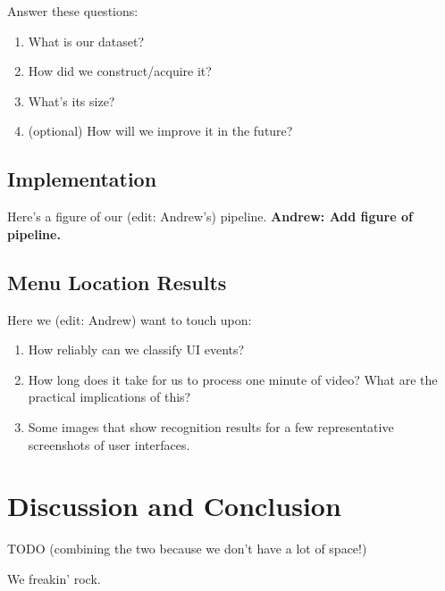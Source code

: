 \documentclass[10pt]{article}
\begin{document}
Answer these questions:
\begin{enumerate}[noitemsep]
\item What is our dataset?
\item How did we construct/acquire it?
\item What's its size?
\item (optional) How will we improve it in the future?
\end{enumerate}


\subsection{Implementation}
Here's a figure of our (edit: Andrew's) pipeline.  \textbf{Andrew: Add figure of pipeline.}

\subsection{Menu Location Results}

Here we (edit: Andrew) want to touch upon:
\begin{enumerate}[noitemsep]
\item How reliably can we classify UI events?
\item How long does it take for us to process one minute of video?  What are
the practical implications of this?
\item Some images that show recognition results for a few representative
screenshots of user interfaces.
\end{enumerate}


\section{Discussion and Conclusion}

TODO (combining the two because we don't have a lot of space!)

We freakin' rock.

\printbibliography
\end{document}
